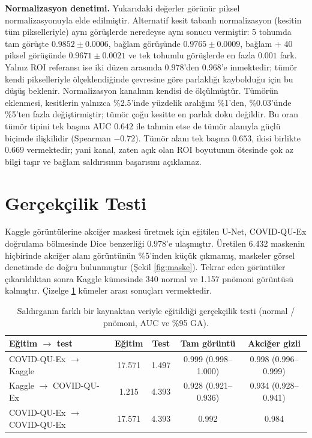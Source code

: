 \textbf{Normalizasyon denetimi.} Yukarıdaki değerler görünür piksel normalizasyonuyla elde edilmiştir. Alternatif kesit tabanlı normalizasyon (kesitin tüm pikselleriyle) aynı görüşlerde neredeyse aynı sonucu vermiştir: 5 tohumda tam görüşte $0.9852 \pm 0.0006$, bağlam görüşünde $0.9765 \pm 0.0009$, bağlam + 40 piksel görüşünde $0.9671 \pm 0.0021$ ve tek tohumlu görüşlerde en fazla $0.001$ fark. Yalnız ROI referansı ise iki düzen arasında $0.978$'den $0.968$'e inmektedir; tümör kendi pikselleriyle ölçeklendiğinde çevresine göre parlaklığı kaybolduğu için bu düşüş beklenir. Normalizasyon kanalının kendisi de ölçülmüştür. Tümörün eklenmesi, kesitlerin yalnızca \%2.5'inde yüzdelik aralığını \%1'den, \%0.03'ünde \%5'ten fazla değiştirmiştir; tümör çoğu kesitte en parlak doku değildir. Bu oran tümör tipini tek başına AUC $0.642$ ile tahmin etse de tümör alanıyla güçlü biçimde ilişkilidir (Spearman $-0.72$). Tümör alanı tek başına $0.653$, ikisi birlikte $0.669$ vermektedir; yani kanal, zaten açık olan ROI boyutunun ötesinde çok az bilgi taşır ve bağlam saldırısının başarısını açıklamaz.

\section{Gerçekçilik Testi}\label{sec:res:transfer}

Kaggle görüntülerine akciğer maskesi üretmek için eğitilen U-Net, COVID-QU-Ex doğrulama bölmesinde Dice benzerliği $0.978$'e ulaşmıştır. Üretilen 6.432 maskenin hiçbirinde akciğer alanı görüntünün \%5'inden küçük çıkmamış, maskeler görsel denetimde de doğru bulunmuştur (Şekil \ref{fig:maske}). Tekrar eden görüntüler çıkarıldıktan sonra Kaggle kümesinde 340 normal ve 1.157 pnömoni görüntüsü kalmıştır. Çizelge \ref{tbl:transfer} kümeler arası sonuçları vermektedir.

\begin{table}[h!]
{\setlength{\tabcolsep}{3pt}
\caption{Saldırganın farklı bir kaynaktan veriyle eğitildiği gerçekçilik testi (normal / pnömoni, AUC ve \%95 GA).}
\begin{center}
\vspace{-6mm}
{\footnotesize
\begin{tabular}{lcccc}
\hline\hline
Eğitim $\rightarrow$ test & Eğitim & Test & Tam görüntü & Akciğer gizli \\
\hline
COVID-QU-Ex $\rightarrow$ Kaggle & 17.571 & 1.497 & 0.999 (0.998--1.000) & 0.998 (0.996--0.999) \\
Kaggle $\rightarrow$ COVID-QU-Ex & 1.215 & 4.393 & 0.928 (0.921--0.936) & 0.934 (0.928--0.941) \\
COVID-QU-Ex $\rightarrow$ COVID-QU-Ex & 17.571 & 4.393 & 0.992 & 0.984 \\
\hline
\end{tabular}}
\vspace{-6mm}
\end{center}
\label{tbl:transfer}}
\end{table}

